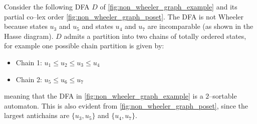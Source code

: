 \begin{example} \label{ex:p-sortable}
    Consider the following DFA $D$ of \cref{fig:non_wheeler_graph_example} and its partial co--lex order \cref{fig:non_wheeler_graph_poset}. The DFA is not Wheeler because states $u_3$ and $u_5$ and states $u_4$ and $u_7$ are incomparable (as shown in the Hasse diagram). $D$ admits a partition into two chains of totally ordered states, for example one possible chain partition is given by:
    \begin{itemize}
        \item Chain 1: $u_1 \leq u_2 \leq u_3 \leq u_4$
        \item Chain 2: $u_5 \leq u_6 \leq u_7$
    \end{itemize}
    meaning that the DFA in \cref{fig:non_wheeler_graph_example} is a $2$--sortable automaton. 
    This is also evident from \cref{fig:non_wheeler_graph_poset}, since the largest antichains are $\{u_3, u_5\}$ and $\{u_4, u_7\}$.

    \begin{figure}[H]
        \centering
        \begin{subfigure}[b]{0.6\textwidth}
            \centering
\end{subfigure}
\end{figure}
\end{example}
